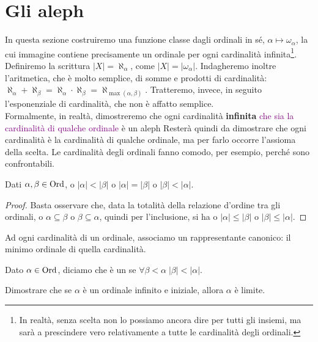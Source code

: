 \section{Gli aleph}
In questa sezione costruiremo una funzione classe dagli ordinali in s\'e, $\alpha \mapsto \omega_\alpha$, la cui immagine contiene precisamente un ordinale per ogni cardinalit\`a infinita\footnote{In realt\`a, senza scelta non lo possiamo ancora dire per tutti gli insiemi, ma sar\`a a prescindere vero relativamente a tutte le cardinalit\`a degli ordinali.}.
Definiremo la scrittura $|X| = \aleph_\alpha$, come $|X| = |\omega_\alpha|$. Indagheremo inoltre l'aritmetica, che \`e molto semplice, di somme e prodotti di cardinalit\`a: $\aleph_\alpha + \aleph_\beta = \aleph_\alpha \cdot \aleph_\beta = \aleph_{\max(\alpha,\beta)}$.
Tratteremo, invece, in seguito l'esponenziale di cardinalit\`a, che non \`e affatto semplice.\\
Formalmente, in realt\`a, dimostreremo che ogni cardinalit\`a \textbf{infinita} \textcolor{purple}{che sia la cardinalit\`a di qualche ordinale} \`e un aleph
Rester\`a quindi da dimostrare che ogni cardinalit\`a \`e la cardinalit\`a di qualche ordinale, ma per farlo occorre l'assioma della scelta.
Le cardinalit\`a degli ordinali fanno comodo, per esempio, perch\'e sono confrontabili.

\begin{remark}
	Dati $\alpha,\beta \in \operatorname{Ord}$, o $|\alpha| < |\beta|$ o $|\alpha| = |\beta|$ o $|\beta| < |\alpha|$.
\end{remark}

\begin{proof}
	Basta osservare che, data la totalit\`a della relazione d'ordine tra gli ordinali, o $\alpha \subseteq \beta$ o $\beta \subseteq \alpha$, quindi per l'inclusione, si ha o $|\alpha| \leq |\beta|$ o $|\beta| \leq |\alpha|$.
\end{proof}

Ad ogni cardinalit\`a di un ordinale, associamo un rappresentante canonico: il minimo ordinale di quella cardinalit\`a.

\begin{definition}
	Dato $\alpha \in \operatorname{Ord}$, diciamo che \`e un  se $\forall \beta < \alpha \; |\beta| < |\alpha|$.
\end{definition}

\begin{exercise}
	Dimostrare che se $\alpha$ \`e un ordinale infinito e iniziale, allora $\alpha$ \`e limite.
\end{exercise}

